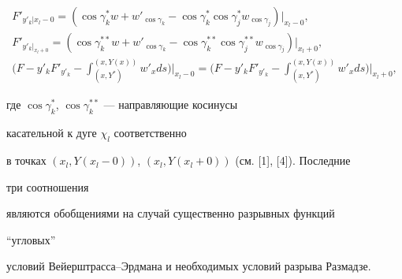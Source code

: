 \begin{gather*} 


F'_{y'_k|x_l-0}=(\cos\gamma^*_k w+w'_{\cos \gamma_k}- 


\cos\gamma^*_k\cos\gamma^*_j w_{\cos\gamma_j})|_{x_l-0},\\ 


% 


F'_{y'_k|_{x_l+0}}=(\cos \gamma^{**}_k w+w'_{\cos\gamma_k}- 


\cos \gamma^{**}_k\cos\gamma^{**}_j 


w_{\cos\gamma_j})|_{x_l+0},\\ 


% 


\Big(F-y'_k F'_{y'_k}-\int^{(x,Y(x))}_{(x,Y^*)} 


w'_x ds\Big)\Big|_{x_l-0}= 


\Big(F-y'_k F'_{y'_k}-\int^{(x,Y(x))}_{(x,Y^*)} 


w'_x ds\Big)\Big|_{x_l+0}, 


\end{gather*} 


где $\cos\gamma^*_k$, $\cos\gamma^{**}_k$ --- направляющие косинусы 


касательной к дуге $\chi_l$ соответственно 


в точках $(x_l,Y(x_l-0))$, $(x_l,Y(x_l+0))$ (см. [1], [4]). Последние 


три соотношения 


являются обобщениями на случай существенно разрывных функций 


``угловых'' 


условий Вейерштрасса--Эрдмана и необходимых условий разрыва Размадзе. 


 


